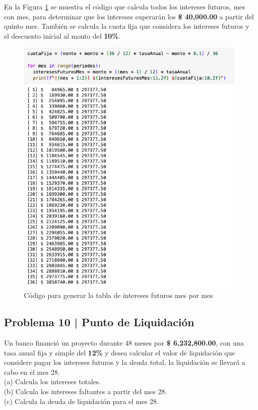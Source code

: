 \documentclass{article}
\begin{document}
\break
\noindent
En la Figura \ref{fig:s109-2} se muestra el código que calcula todos los intereses futuros, mes con mes, para determinar que los intereses superarán los \textbf{\$ 40,000.00} a partir del quinto mes. También se calcula la cuota fija que considera los intereses futuros y el descuento inicial al monto del \textbf{10\%}.
\begin{figure}[!ht]
    \centering
    \begin{minipage}{\textwidth}
        \centering
        \includegraphics[width=\textwidth]{figures/s109-2.png}
    \end{minipage}
    \captionsetup{width=0.9\textwidth}
    \caption{Código para generar la tabla de intereses futuros mes por mes}
    \label{fig:s109-2}
\end{figure}

\clearpage

\subsection*{Problema 10 | Punto de Liquidación}

Un banco financió un proyecto durante 48 meses por \textbf{\$ 6,232,800.00}, con una tasa anual fija y simple del \textbf{12\%} y desea calcular el valor de liquidación que considere pagar los intereses futuros y la deuda total, la liquidación se llevará a cabo en el mes 28.
\\[12pt]
(a) Calcula los intereses totales.
\\[6pt]
(b) Calcula los intereses faltantes a partir del mes 28.
\\[6pt]
(c) Calcula la deuda de liquidación para el mes 28.
\end{document}
